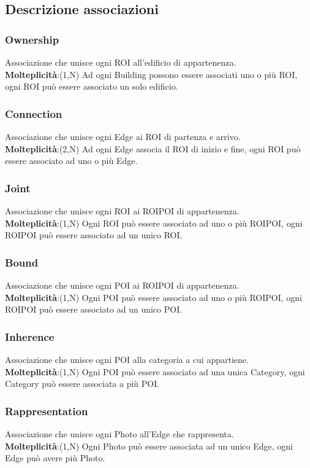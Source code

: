 \documentclass[../ManualeSviluppatore.tex]{subfiles}
\begin{document}
	\subsection{Descrizione associazioni}
		\subsubsection{Ownership}
			Associazione che unisce ogni ROI all'edificio di appartenenza.\\
			\textbf{Molteplicità}:(1,N) Ad ogni Building possono essere associati uno o più ROI, ogni ROI può essere associato un solo edificio.

		\subsubsection{Connection}
			Associazione che unisce ogni Edge ai ROI di partenza e arrivo. \\
			\textbf{Molteplicità}:(2,N) Ad ogni Edge associa il ROI di inizio e fine, ogni ROI può essere associato ad uno o più Edge.

		\subsubsection{Joint}
			Associazione che unisce ogni ROI ai ROIPOI di appartenenza. \\
			\textbf{Molteplicità}:(1,N) Ogni ROI può essere associato ad uno o più ROIPOI, ogni ROIPOI può essere associato ad un unico ROI.

		\subsubsection{Bound}
			Associazione che unisce ogni POI ai ROIPOI di appartenenza. \\
			\textbf{Molteplicità}:(1,N) Ogni POI può essere associato ad uno o più ROIPOI, ogni ROIPOI può essere associato ad un unico POI.

		\subsubsection{Inherence}
			Associazione che unisce ogni POI alla categoria a cui appartiene.\\
			\textbf{Molteplicità}:(1,N) Ogni POI può essere associato ad una unica Category, ogni Category può essere associata a più POI.

		\subsubsection{Rappresentation}
			Associazione che unisce ogni Photo all'Edge che rappresenta. \\
			\textbf{Molteplicità}:(1,N) Ogni Photo può essere associata ad un unico Edge, ogni Edge può avere più Photo.
\end{document}

